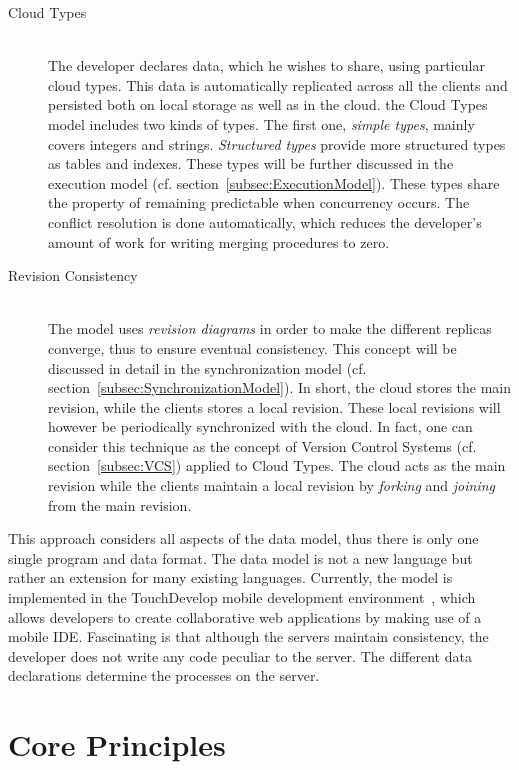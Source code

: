 \documentclass[a4paper,12pt]{report}
\begin{document}
\begin{description}
    \item[Cloud Types] \hfill \\The developer declares data, which he wishes to share, using particular cloud types. This data is automatically replicated across all the clients and persisted both on local storage as well as in the cloud. the Cloud Types model includes two kinds of types. The first one, \textit{simple types}, mainly covers integers and strings. \textit{Structured types} provide more structured types as tables and indexes. These types will be further discussed in the execution model (cf. section~\ref{subsec:ExecutionModel}). These types share the property of remaining predictable when concurrency occurs. The conflict resolution is done automatically, which reduces the developer's amount of work for writing merging procedures to zero.
    \item[Revision Consistency] \hfill \\ The model uses \textit{revision diagrams} in order to make the different replicas converge, thus to ensure eventual consistency. This concept will be discussed in detail in the synchronization model (cf. section~\ref{subsec:SynchronizationModel}). In short, the cloud stores the main revision, while the clients stores a local revision. These local revisions will however be periodically synchronized with the cloud. In fact, one can consider this technique as the concept of Version Control Systems (cf. section~\ref{subsec:VCS}) applied to Cloud Types. The cloud acts as the main revision while the clients maintain a local revision by \textit{forking} and \textit{joining} from the main revision.
\end{description} 

This approach considers all aspects of the data model, thus there is only one single program and data format. The data model is not a new language but rather an extension for many existing languages. Currently, the model is implemented in the TouchDevelop mobile development environment~\cite{TouchDevelop}, which allows developers to create collaborative web applications by making use of a mobile IDE. Fascinating is that although the servers maintain consistency, the developer does not write any code peculiar to the server. The different data declarations determine the processes on the server. 

\section{Core Principles}\label{sec:CorePrinciples}
\end{document}
